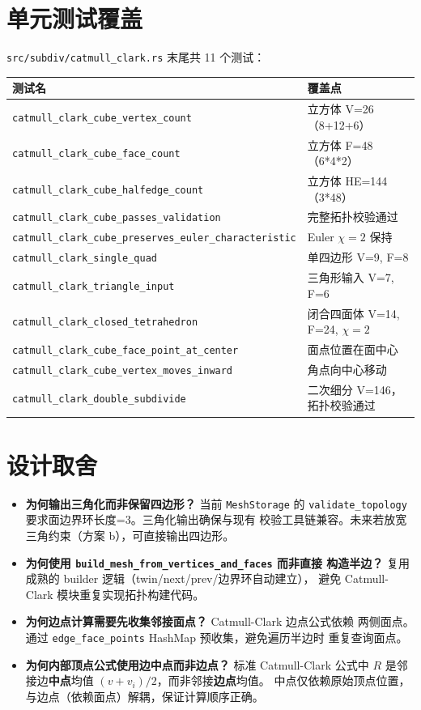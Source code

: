 \documentclass[11pt,a4paper]{article}
\begin{document}
\section{单元测试覆盖}

\texttt{src/subdiv/catmull\_clark.rs} 末尾共 11 个测试：

\begin{center}
\scriptsize
\renewcommand{\arraystretch}{1.18}
\begin{longtable}{@{}ll@{}}
  \toprule
  \textbf{测试名} & \textbf{覆盖点} \\
  \midrule
  \texttt{catmull\_clark\_cube\_vertex\_count} & 立方体 V=26（8+12+6） \\
  \texttt{catmull\_clark\_cube\_face\_count} & 立方体 F=48（6*4*2） \\
  \texttt{catmull\_clark\_cube\_halfedge\_count} & 立方体 HE=144（3*48） \\
  \texttt{catmull\_clark\_cube\_passes\_validation} & 完整拓扑校验通过 \\
  \texttt{catmull\_clark\_cube\_preserves\_euler\_characteristic} & Euler $\chi=2$ 保持 \\
  \texttt{catmull\_clark\_single\_quad} & 单四边形 V=9, F=8 \\
  \texttt{catmull\_clark\_triangle\_input} & 三角形输入 V=7, F=6 \\
  \texttt{catmull\_clark\_closed\_tetrahedron} & 闭合四面体 V=14, F=24, $\chi=2$ \\
  \texttt{catmull\_clark\_cube\_face\_point\_at\_center} & 面点位置在面中心 \\
  \texttt{catmull\_clark\_cube\_vertex\_moves\_inward} & 角点向中心移动 \\
  \texttt{catmull\_clark\_double\_subdivide} & 二次细分 V=146，拓扑校验通过 \\
  \bottomrule
\end{longtable}
\end{center}

\section{设计取舍}

\begin{itemize}
  \item \textbf{为何输出三角化而非保留四边形？} 当前 \texttt{MeshStorage} 的
        \texttt{validate\_topology} 要求面边界环长度=3。三角化输出确保与现有
        校验工具链兼容。未来若放宽三角约束（方案 b），可直接输出四边形。
  \item \textbf{为何使用 \texttt{build\_mesh\_from\_vertices\_and\_faces} 而非直接
        构造半边？} 复用成熟的 builder 逻辑（twin/next/prev/边界环自动建立），
        避免 Catmull-Clark 模块重复实现拓扑构建代码。
  \item \textbf{为何边点计算需要先收集邻接面点？} Catmull-Clark 边点公式依赖
        两侧面点。通过 \texttt{edge\_face\_points} HashMap 预收集，避免遍历半边时
        重复查询面点。
  \item \textbf{为何内部顶点公式使用边中点而非边点？} 标准 Catmull-Clark 公式中
        $R$ 是邻接边\textbf{中点}均值 $(v+v_i)/2$，而非邻接\textbf{边点}均值。
        中点仅依赖原始顶点位置，与边点（依赖面点）解耦，保证计算顺序正确。
\end{itemize}
\end{document}

